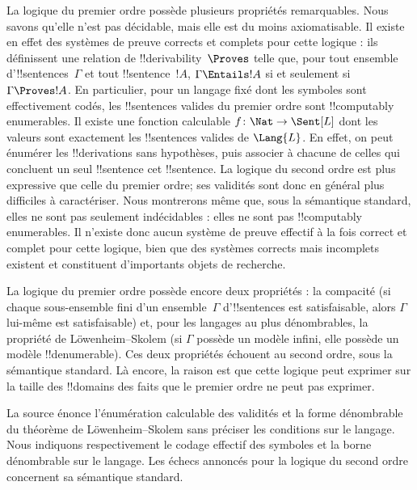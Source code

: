 \documentclass[../../../include/open-logic-section]{subfiles}
\begin{document}


La logique du premier ordre possède plusieurs
propriétés remarquables. Nous savons qu'elle
n'est pas décidable, mais elle est du moins
axiomatisable. Il existe en effet des systèmes
de preuve corrects et complets pour cette
logique : ils définissent une relation de
!!{derivability}~$\Proves$ telle que, pour
tout ensemble d'!!{sentence}s~$\Gamma$ et
tout !!{sentence}~$!A$,
$\Gamma\Entails !A$ si et seulement si
$\Gamma\Proves !A$.
En particulier, pour un langage fixé dont
les symboles sont effectivement codés, les
!!{sentence}s valides du premier ordre sont
!!{computably enumerable}s. Il existe une
fonction calculable
$f\colon\Nat\to\Sent[L]$ dont les valeurs
sont exactement les !!{sentence}s valides de
$\Lang{L}$. En effet, on peut énumérer les
!!{derivation}s sans hypothèses, puis associer à chacune de
celles qui concluent un seul !!{sentence}
cet !!{sentence}. La logique du second ordre
est plus expressive que celle du premier ordre;
ses validités sont donc en général plus difficiles
à caractériser. Nous montrerons même que, sous
la sémantique standard, elles ne sont pas seulement
indécidables : elles ne sont pas
!!{computably enumerable}s. Il n'existe donc
aucun système de preuve effectif à la fois correct et
complet pour cette logique, bien que des systèmes
corrects mais incomplets existent et constituent
d'importants objets de recherche.

La logique du premier ordre possède encore deux
propriétés : la compacité (si chaque sous-ensemble
fini d'un ensemble~$\Gamma$ d'!!{sentence}s est
satisfaisable, alors $\Gamma$ lui-même est
satisfaisable) et, pour les langages au plus
dénombrables, la propriété de Löwenheim--Skolem
(si $\Gamma$ possède un modèle infini, elle
possède un modèle !!{denumerable}). Ces deux
propriétés échouent au second ordre, sous la
sémantique standard. Là encore, la raison est
que cette logique peut exprimer sur la taille
des !!{domain}s des faits que le premier ordre
ne peut pas exprimer.

\begin{editorial}
La source énonce l'énumération calculable des
validités et la forme dénombrable du théorème
de Löwenheim--Skolem sans préciser les conditions
sur le langage. Nous indiquons respectivement
le codage effectif des symboles et la borne
dénombrable sur le langage. Les échecs annoncés
pour la logique du second ordre concernent sa
sémantique standard.
\end{editorial}
\end{document}
